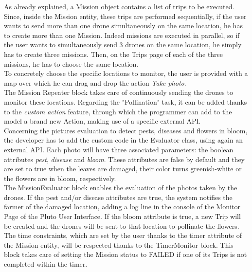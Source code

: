 As already explained, a Mission object contains a list of trips to be executed.
Since, inside the Mission entity, these trips are performed sequentially, if the user wants to send more than one drone simultaneously on the same location, he has to create more than one Mission.
Indeed missions are executed in parallel, so if the user wants to simultaneously send 3 drones on the same location, he simply has to create three missions.
Then, on the Trips page of each of the three missions, he has to choose the same location.
\\

To concretely choose the specific locations to monitor, the user is provided with a map over which he can drag and drop the action \textit{Take photo}.
\\

The Mission Repeater block takes care of continuously sending the drones to monitor these locations.
Regarding the "Pollination" task, it can be added thanks to the \textit{custom action} feature, through which the programmer can add to the model a brand new Action, making use of a specific external API.
\\

Concerning the pictures evaluation to detect pests, diseases and flowers in bloom, the developer has to add the custom code in the Evaluator class, using again an external API. 
Each photo will have three associated parameters: the boolean attributes \textit{pest}, \textit{disease} and \textit{bloom}.
These attributes are false by default and they are set to true when the leaves are damaged, their color turns greenish-white or the flowers are in bloom, respectively. 
\\

The MissionEvaluator block enables the evaluation of the photos taken by the drones. If the pest and/or disease attributes are true, the system notifies the farmer of the damaged location, adding a log line in the console of the Monitor Page of the Pluto User Interface.
If the bloom attribute is true, a new Trip will be created and the drones will be sent to that location to pollinate the flowers.
\\

The time constraints, which are set by the user thanks to the timer attribute of the Mission entity, will be respected thanks to the TimerMonitor block.
This block takes care of setting the Mission status to FAILED if one of its Trips is not completed within the timer.
\\

